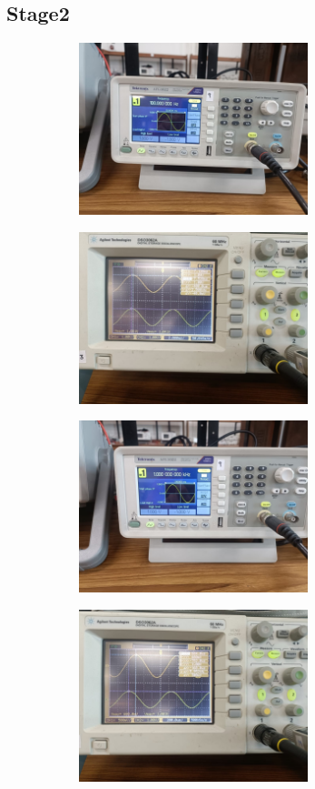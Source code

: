 \documentclass[a4paper,12pt]{article}
\begin{document}
\subsection*{Stage2}
\begin{figure}[H]
    \centering
    \begin{subfigure}{0.5\textwidth}
        \centering
        \includegraphics[height=5cm]{figs/Stage2/100/para.jpeg}
    \end{subfigure}%
    \begin{subfigure}{0.5\textwidth}
        \centering
        \includegraphics[height=5cm]{figs/Stage2/100/plot.jpeg}
    \end{subfigure}
\end{figure}
\begin{figure}[H]
    \centering
    \begin{subfigure}{0.5\textwidth}
        \centering
        \includegraphics[height=5cm]{figs/Stage2/1000/para.jpeg}
    \end{subfigure}%
    \begin{subfigure}{0.5\textwidth}
        \centering
        \includegraphics[height=5cm]{figs/Stage2/1000/plot.jpeg}
    \end{subfigure}
\end{figure}
\end{document}
